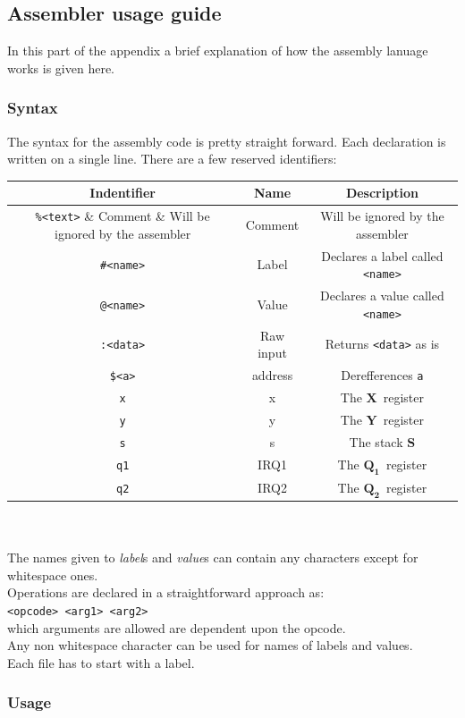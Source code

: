 \documentclass{article}
\newcommand{\V}{\verb}
\newcommand{\x}{$\textbf{X}$}
\newcommand{\y}{$\textbf{Y}$}
\newcommand{\s}{$\textbf{S}$}
\newcommand{\q}{$\textbf{Q}_{\textbf{1}}$}
\newcommand{\qq}{$\textbf{Q}_{\textbf{2}}$}
\begin{document}
\subsection{Assembler usage guide}

In this part of the appendix a brief explanation of how the assembly lanuage
works is given here.
\subsubsection{Syntax}
The syntax for the assembly code is pretty straight forward. Each declaration is
written on a single line. There are a few reserved identifiers:

\begin{tabular}{|c | c| c |}
\hline
Indentifier & Name & Description\\
\hline
\V+%
\hline
\V+#<name>+ & Label & Declares a label called \V+<name>+ \\
\hline
\V+@<name>+ & Value & Declares a value called \V+<name>+\\
\hline
\V+:<data>+ & Raw input & Returns \V+<data>+ as is \\
\hline
\verb+$<a>+ & address & Derefferences \V+a+\\
\hline
\V+x+ & x & The \x \ register \\
\hline
\V+y+ & y & The \y \ register \\
\hline
\V+s+ & s & The stack \s \\
\hline
\V+q1+ & IRQ1 & The \q \ register\\
\hline
\V+q2+ & IRQ2 & The \qq \ register\\
\hline
\end{tabular}
\\
\\
The names given to \emph{label}s and \emph{value}s can contain any characters except for
whitespace ones.\\
Operations are declared in a straightforward approach as:\\
\V+<opcode> <arg1> <arg2>+ \\
which arguments are allowed are dependent upon the opcode.\\
Any non whitespace character can be used for names of labels and values.\\
Each file has to start with a label.

\subsubsection{Usage}
\end{document}
